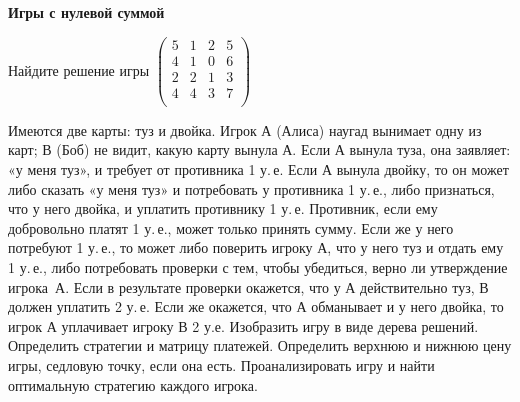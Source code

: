 \documentclass[a5paper,10pt]{extarticle}
\begin{document}
\begin{enumerate}
  {\item[]
          \bfseries Игры с нулевой суммой
          \par\vspace{1mm}
  }
\item Найдите решение игры
$
\begin{pmatrix}
  5 & 1 & 2 & 5 \\
  4 & 1 & 0 & 6 \\
  2 & 2 & 1 & 3 \\
  4 & 4 & 3 & 7 \\
\end{pmatrix}
$



\item Имеются две карты: туз и двойка. Игрок А (Алиса) наугад вынимает одну из карт; В (Боб) не видит, какую карту вынула А. 
Если А вынула туза, она заявляет: «у меня туз», и требует от противника 1 у.\,е. Если 
А вынула двойку, то он может либо сказать «у меня туз» и потребовать у противника 1 у.\,е., либо признаться, что у него двойка, и уплатить противнику 1 у.\,е.
Противник, если ему добровольно платят 1 у.\,е., может только принять сумму. 
Если же у него потребуют 1 у.\,е., то может либо поверить игроку А, что у него туз и отдать ему  1  у.\,е.,  либо  потребовать  проверки  с  тем,  чтобы  убедиться,  верно  ли утверждение игрока~А. Если в результате проверки окажется, что у А действительно туз, В должен уплатить 2 у.\,е. Если же окажется, что А обманывает и у него двойка, то игрок А уплачивает игроку В 2 у.е. Изобразить игру в виде дерева решений. 
Определить стратегии и матрицу платежей. 
Определить верхнюю и нижнюю цену игры, седловую точку, если она есть.
Проанализировать игру и найти оптимальную стратегию каждого игрока.



\end{enumerate}
\end{document}

